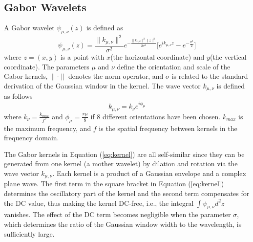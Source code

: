 \documentclass[a4paper,10pt]{article}
\begin{document}
\subsection{Gabor Wavelets}
A Gabor wavelet $\psi_{\mu,\nu}(z)$ \cite{Liu2004} is defined as
\begin{equation}\label{eq:kernel}
   \psi_{\mu,\nu}(z)=\frac{\|{k_{\mu,\nu}}\| ^ {2}}{\sigma ^{2}}
e^{-\frac{\|{k_{\mu,\nu}}\|^ {2}\|z\|^{2}}{2\sigma ^{2}}}\lbrack{e^{i
k_{\mu,\nu} z}-e^{-\frac{\sigma^2}{2}}}\rbrack
\end{equation}
where $z=(x,y)$ is a point with $x$(the horizontal coordinate) and $y$(the vertical coordinate). The parameters $\mu$ and $\nu$ define the orientation and scale of the Gabor kernels, $\|\cdot\|$ denotes the norm operator, and $\sigma$ is related to the standard derivation of the Gaussian window in the kernel. The wave vector $k_{\mu,\nu}$ is defined as follows
\begin{equation}\label{eq:wavevector}
k_{\mu,\nu}=k_{\nu}e^{i\phi_{\mu}}
\end{equation}
where $k_{\nu}=\frac{k_{max}}{f^{\nu}}$ and $\phi_{\mu}=\frac{\pi\mu}{8}$ if 8 different orientations have been chosen. $k_{max}$ is the maximum frequency, and $f$ is the spatial frequency between kernels in the frequency domain.

The Gabor kernels in \mbox{Equation} (\ref{eq:kernel}) are all self-similar since they can be generated from one kernel (a mother wavelet) by dilation and rotation via the wave vector $k_{\mu,\nu}$. Each kernel is a product of a Gaussian envelope and a complex plane wave. The first term in the square bracket in \mbox{Equation} (\ref{eq:kernel}) determines the oscillatory part of the kernel and the second term compensates for the DC value, thus making the kernel DC-free, i.e., the integral $\int{\psi_{\mu,\nu}}d^{2}{z}$ vanishes. The effect of the DC term becomes negligible when the parameter $\sigma$, which determines the ratio of the Gaussian window width to the wavelength, is sufficiently large.
\end{document}
